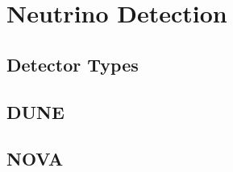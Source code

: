\section{Neutrino Detection}

  \subsection{Detector Types}

  \subsection{DUNE}

  \subsection{NOVA}
